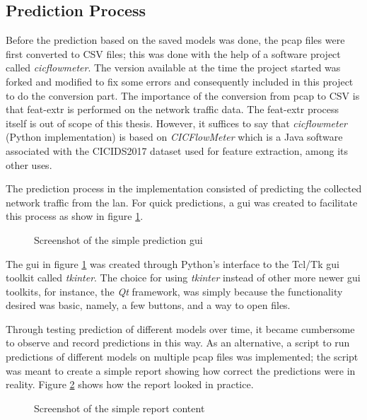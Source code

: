 \subsection{Prediction Process}
Before the prediction based on the saved models was done, the \gls{pcap} files were first converted to CSV files;
this was done with the help of a software project called \emph{cicflowmeter}.
The version available at the time the project started was forked and modified to fix some errors and consequently included in this project
to do the conversion part.
The importance of the conversion from \gls{pcap} to CSV is that \gls{feat-extr} is performed on the network traffic data.
The \gls{feat-extr} process itself is out of scope of this thesis.
However, it suffices to say that \emph{cicflowmeter} (Python implementation) is based on \emph{CICFlowMeter} which is a Java software associated with the CICIDS2017 dataset used for feature extraction, among its other uses.


The prediction process in the implementation consisted of predicting the collected network traffic from the \gls{lan}.
For quick predictions, a \gls{gui} was created to facilitate this process as show in figure \ref{fig:gui}.


\begin{figure}[H]
\centering
{}
\caption{Screenshot of the simple prediction \gls{gui}}
\label{fig:gui}
\end{figure}

The \gls{gui} in figure \ref{fig:gui} was created through Python's interface to the Tcl/Tk \gls{gui} toolkit called \emph{tkinter}.
The choice for using \emph{tkinter} instead of other more newer \gls{gui} toolkits, for instance, the \emph{Qt} framework, was
simply because the functionality desired was basic, namely, a few buttons, and a way to open files.

Through testing prediction of different models over time, it became cumbersome to observe and record predictions in this way.
As an alternative, a script to run predictions of different models on multiple \gls{pcap} files was implemented;
the script was meant to create a simple report showing how correct the predictions were in reality.
Figure \ref{fig:t-report} shows how the report looked in practice.


\begin{figure}[H]
\centering
{}
\caption{Screenshot of the simple report content}
\label{fig:t-report}
\end{figure}

